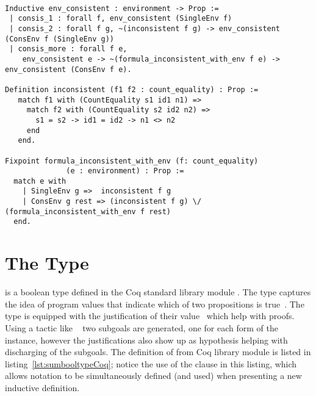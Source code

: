
\begin{minipage}[c]{0.95\textwidth}
\begin{lstlisting}

Inductive env_consistent : environment -> Prop :=
 | consis_1 : forall f, env_consistent (SingleEnv f)
 | consis_2 : forall f g, ~(inconsistent f g) -> env_consistent (ConsEnv f (SingleEnv g))
 | consis_more : forall f e,
    env_consistent e -> ~(formula_inconsistent_with_env f e) -> env_consistent (ConsEnv f e).

Definition inconsistent (f1 f2 : count_equality) : Prop :=
   match f1 with (CountEquality s1 id1 n1) =>
     match f2 with (CountEquality s2 id2 n2) =>
       s1 = s2 -> id1 = id2 -> n1 <> n2
     end
   end.

Fixpoint formula_inconsistent_with_env (f: count_equality)
			  (e : environment) : Prop :=
  match e with
    | SingleEnv g =>  inconsistent f g
    | ConsEnv g rest => (inconsistent f g) \/ (formula_inconsistent_with_env f rest)
  end.
\end{lstlisting}
\end{minipage}

\section{The  Type}\label{sec:sumboolsection}

 is a boolean type defined in the Coq standard library module . The  type captures the idea of program values that indicate which of two propositions is true~\cite{chlipalacpdt2011}. The  type is equipped with the justification of their value~\cite{Coq:manual} which help with proofs. Using a tactic like ~\cite{Coq:manual} two subgoals are generated, one for each form of the  instance, however the justifications also show up as hypothesis helping with discharging of the subgoals. The definition of  from Coq library module  is listed in listing~\ref{lst:sumbooltypeCoq}; notice the use of the  clause in this listing, which allows notation to be simultaneously defined (and used) when presenting a new inductive definition.

